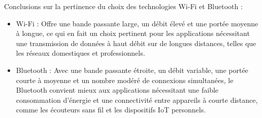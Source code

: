 \documentclass[12]{article}
\begin{document}
Conclusions sur la pertinence du choix des technologies Wi-Fi et Bluetooth :
\begin{itemize}
    \item Wi-Fi : Offre une bande passante large, un débit élevé et une portée moyenne à longue, ce qui en fait un choix pertinent pour les applications nécessitant une transmission de données à haut débit sur de longues distances, telles que les réseaux domestiques et professionnels.
    \item Bluetooth : Avec une bande passante étroite, un débit variable, une portée courte à moyenne et un nombre modéré de connexions simultanées, le Bluetooth convient mieux aux applications nécessitant une faible consommation d'énergie et une connectivité entre appareils à courte distance, comme les écouteurs sans fil et les dispositifs IoT personnels.
\end{itemize}
\end{document}
